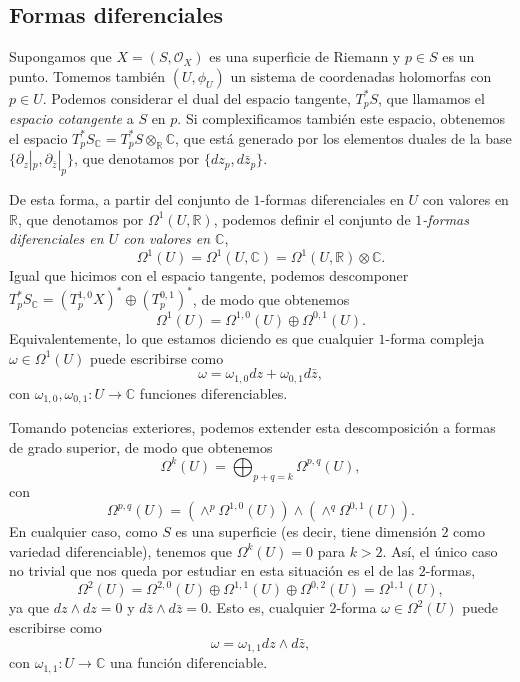 \documentclass[autocontact]{gaceta}
\theoremstyle{definition} \newtheorem{defn}[thm]{Definición}
\theoremstyle{definition} \newtheorem{ejemplo}[thm]{Ejemplo}
\theoremstyle{definition} \newtheorem{ejercicio}[thm]{Ejercicio}
\def\CC{\mathbb{C}}
\def\RR{\mathbb{R}}
\def\OO{\mathscr{O}}
\begin{document}
    \subsection{Formas diferenciales}
    Supongamos que $X=(S,\OO_X)$ es una superficie de Riemann y $p\in S$ es un punto. Tomemos también $(U,\phi_U)$ un sistema de coordenadas holomorfas con $p \in U$. Podemos considerar el dual del espacio tangente, $T^*_p S$, que llamamos el \emph{espacio cotangente} a $S$ en $p$. Si complexificamos también este espacio, obtenemos el espacio $T^*_pS_{\CC} = T^*_p S \otimes_\RR \CC$, que está generado por los elementos duales de la base $\{\partial_z|_p, \partial_{\bar{z}}|_p\}$, que denotamos por $\{dz_p, d\bar{z}_p\}$. 

    De esta forma, a partir del conjunto de $1$-formas diferenciales en $U$ con valores en $\RR$, que denotamos por $\Omega^1(U,\RR)$, podemos definir el conjunto de \emph{$1$-formas diferenciales en $U$ con valores en $\CC$},
    \begin{equation*}
      \Omega^1(U)=\Omega^1(U,\CC) = \Omega^1(U,\RR) \otimes \CC.
    \end{equation*}
    Igual que hicimos con el espacio tangente, podemos descomponer $T^*_p S_\CC = (T_p^{1,0}X) ^* \oplus (T_p^{0,1})^*$, de modo que obtenemos
    \begin{equation*}
      \Omega^1(U)=\Omega^{1,0}(U) \oplus \Omega^{0,1}(U).
    \end{equation*}
    Equivalentemente, lo que estamos diciendo es que cualquier $1$-forma compleja $\omega\in \Omega^1(U)$ puede escribirse como
    \begin{equation*}
      \omega= \omega_{1,0} dz + \omega_{0,1}d\bar{z},
    \end{equation*}
    con $\omega_{1,0},\omega_{0,1}:U \rightarrow \CC$ funciones diferenciables.

    Tomando potencias exteriores, podemos extender esta descomposición a formas de grado superior, de modo que obtenemos
    \begin{equation*}
      \Omega^k(U) = \bigoplus_{p+q=k} \Omega^{p,q}(U),
    \end{equation*}
    con 
    \begin{equation*}
      \Omega^{p,q}(U)= \left( \wedge^p \Omega^{1,0}(U) \right) \wedge \left( \wedge^q \Omega^{0,1}(U) \right).
    \end{equation*}
    En cualquier caso, como $S$ es una superficie (es decir, tiene dimensión $2$ como variedad diferenciable), tenemos que $\Omega^k(U)=0$ para $k>2$. Así, el único caso no trivial que nos queda por estudiar en esta situación es el de las $2$-formas,
    \begin{equation*}
      \Omega^2(U)= \Omega^{2,0}(U) \oplus \Omega^{1,1}(U) \oplus \Omega^{0,2}(U)= \Omega^{1,1}(U),
    \end{equation*}
    ya que $dz\wedge dz = 0$ y $d\bar{z} \wedge d\bar{z}= 0$. Esto es, cualquier $2$-forma $\omega \in \Omega^2(U)$ puede escribirse como
    \begin{equation*}
      \omega = \omega_{1,1} dz \wedge d\bar{z},
    \end{equation*}
    con $\omega_{1,1}:U\rightarrow \CC$ una función diferenciable.
\end{document}
